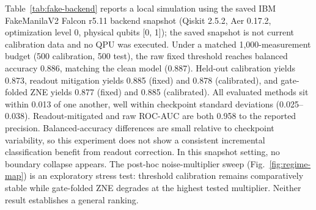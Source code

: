 \documentclass[conference]{IEEEtran}
\begin{document}
Table~\ref{tab:fake-backend} reports a local simulation using the saved IBM FakeManilaV2 Falcon r5.11 backend snapshot (Qiskit 2.5.2, Aer 0.17.2, optimization level 0, physical qubits [0, 1]); the saved snapshot is not current calibration data and no QPU was executed. Under a matched 1,000-measurement budget (500 calibration, 500 test), the raw fixed threshold reaches balanced accuracy 0.886, matching the clean model (0.887). Held-out calibration yields 0.873, readout mitigation yields 0.885 (fixed) and 0.878 (calibrated), and gate-folded ZNE yields 0.877 (fixed) and 0.885 (calibrated). All evaluated methods sit within 0.013 of one another, well within checkpoint standard deviations (0.025--0.038). Readout-mitigated and raw ROC-AUC are both 0.958 to the reported precision. Balanced-accuracy differences are small relative to checkpoint variability, so this experiment does not show a consistent incremental classification benefit from readout correction. In this snapshot setting, no boundary collapse appears. The post-hoc noise-multiplier sweep (Fig.~\ref{fig:regime-map}) is an exploratory stress test: threshold calibration remains comparatively stable while gate-folded ZNE degrades at the highest tested multiplier. Neither result establishes a general ranking.
\end{document}
